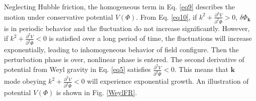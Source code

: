 \documentclass[12pt, a4paper]{article}
\begin{document}
Neglecting Hubble friction, the homogeneous term in Eq. \ref{eq9} describes the motion under conservative potential $V\left(\Phi\right)$. From Eq. \ref{eq10}, if $k^2+\frac{\partial^2 V}{\partial^2\Phi}>0$, $\delta\Phi_{\bm{k}}$ is in periodic behavior and the fluctuation do not increase significantly. However, if $k^2+\frac{\partial^2 V}{\partial^2\Phi}<0$ is satisfied over a long period of time, the fluctuations will increase exponentially, leading to inhomogeneous behavior of field configure. Then the perturbation phase is over, nonlinear phase is entered. The second derivative of potential from Weyl gravity in Eq. \ref{eq5} satisfies $\frac{\partial^2 V}{\partial^2\Phi}<0$. This means that $\bm{k}$ mode obeying $k^2+\frac{\partial^2 V}{\partial^2\Phi}<0$ will experience exponential growth. An illustration of potential $V\left(\Phi\right)$ is shown in Fig. \ref{WeylFR}.

\end{document}
